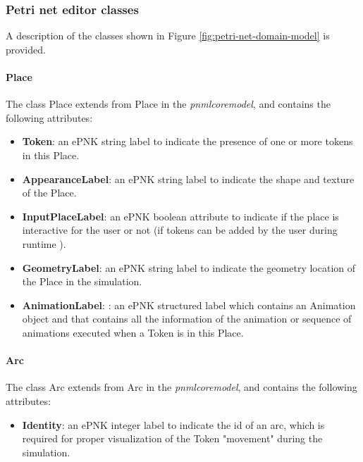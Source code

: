 \subsubsection{Petri net editor classes}

A description of the classes shown in Figure \ref{fig:petri-net-domain-model} is provided.

\paragraph{Place}

The class Place extends from Place in the \textit{pnmlcoremodel}, and contains the following attributes:

\begin{itemize}
	\item \textbf{Token}: an ePNK string label to indicate the presence of one or more tokens in this Place.
	\item \textbf{AppearanceLabel}: an ePNK string label to indicate the shape and texture of the Place.
	\item \textbf{InputPlaceLabel}: an ePNK boolean attribute to indicate if the place is interactive for the user or not (if tokens can be added by the user during runtime ).
	\item \textbf{GeometryLabel}: an ePNK string label to indicate the geometry location of the Place in the simulation.
	\item \textbf{AnimationLabel}: : an ePNK structured label which contains an Animation object and that contains all the information of the animation or sequence of animations executed when a Token is in this Place.
\end{itemize}

\paragraph{Arc}

The class Arc extends from Arc in the \textit{pnmlcoremodel}, and contains the following attributes:

\begin{itemize}
	\item \textbf{Identity}: an ePNK integer label to indicate the id of an arc, which is required for proper visualization of the Token "movement" during the simulation.
\end{itemize}